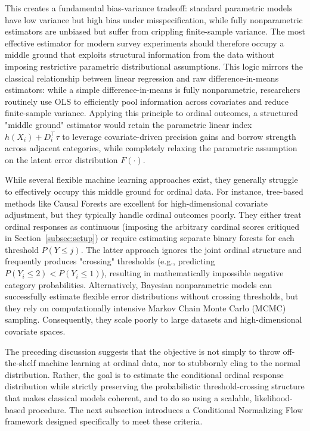 \documentclass{article}
\begin{document}
This creates a fundamental bias-variance tradeoff: standard parametric models have low variance but high bias under misspecification, while fully nonparametric estimators are unbiased but suffer from crippling finite-sample variance. 
The most effective estimator for modern survey experiments should therefore occupy a middle ground that exploits structural information from the data without imposing restrictive parametric distributional assumptions. This logic mirrors the classical relationship between linear regression and raw difference-in-means estimators: while a simple difference-in-means is fully nonparametric, researchers routinely use OLS to efficiently pool information across covariates and reduce finite-sample variance. Applying this principle to ordinal outcomes, a structured "middle ground" estimator would retain the parametric linear index $h(X_i) + D_i^\top\tau$ to leverage covariate-driven precision gains and borrow strength across adjacent categories, while completely relaxing the parametric assumption on the latent error distribution $F(\cdot)$. 

While several flexible machine learning approaches exist, they generally struggle to effectively occupy this middle ground for ordinal data. For instance, tree-based methods like Causal Forests \citep{Breiman2001a} are excellent for high-dimensional covariate adjustment, but they typically handle ordinal outcomes poorly. They either treat ordinal responses as continuous (imposing the arbitrary cardinal scores critiqued in Section~\ref{subsec:setup}) or require estimating separate binary forests for each threshold $P(Y \le j)$. The latter approach ignores the joint ordinal structure and frequently produces "crossing" thresholds (e.g., predicting $P(Y_i \le 2) < P(Y_i \le 1)$), resulting in mathematically impossible negative category probabilities. Alternatively, Bayesian nonparametric models \citep{Zhou2019a} can successfully estimate flexible error distributions without crossing thresholds, but they rely on computationally intensive Markov Chain Monte Carlo (MCMC) sampling. Consequently, they scale poorly to large datasets and high-dimensional covariate spaces. 

The preceding discussion suggests that the objective is not simply to throw off-the-shelf machine learning at ordinal data, nor to stubbornly cling to the normal distribution. Rather, the goal is to estimate the conditional ordinal response distribution while strictly preserving the probabilistic threshold-crossing structure that makes classical models coherent, and to do so using a scalable, likelihood-based procedure. The next subsection introduces a Conditional Normalizing Flow framework designed specifically to meet these criteria.
\end{document}
